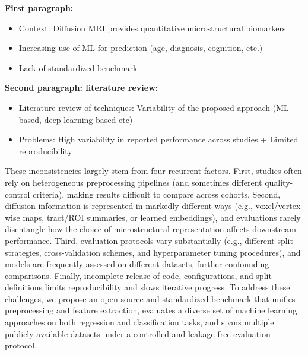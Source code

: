 \textbf{First paragraph:}
\begin{itemize}
    \item Context: Diffusion MRI provides quantitative microstructural biomarkers
    \item Increasing use of ML for prediction (age, diagnosis, cognition, etc.)
    \item Lack of standardized benchmark
\end{itemize}

\noindent \textbf{Second paragraph: literature review:}
\begin{itemize}
    \item  Literature review of techniques: Variability of the proposed approach (ML-based, deep-learning based etc)
    \item Problems: High variability in reported performance across studies + Limited reproducibility 
\end{itemize}


These inconsistencies largely stem from four recurrent factors. First, studies often rely on 
heterogeneous preprocessing pipelines (and sometimes different quality-control criteria), 
making results difficult to compare across cohorts. Second, diffusion information is represented in 
markedly different ways (e.g., voxel/vertex-wise maps, tract/ROI summaries, or learned embeddings), 
and evaluations rarely disentangle how the choice of microstructural representation affects downstream 
performance. Third, evaluation protocols vary substantially (e.g., different split strategies, 
cross-validation schemes, and hyperparameter tuning procedures), and models are frequently assessed on 
different datasets, further confounding comparisons. Finally, incomplete release of code, 
configurations, and split definitions limits reproducibility and slows iterative progress. To address 
these challenges, we propose an open-source and standardized benchmark that unifies preprocessing and 
feature extraction, evaluates a diverse set of machine learning approaches on both regression and 
classification tasks, and spans multiple publicly available datasets under a controlled and leakage-free 
evaluation protocol.


